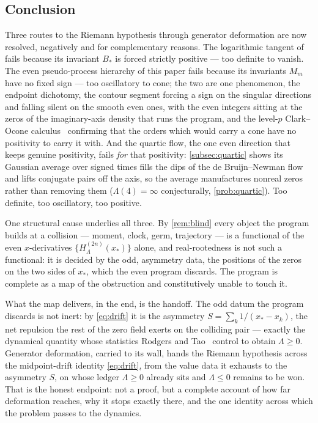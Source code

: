 \documentclass[11pt,reqno]{amsart}
\theoremstyle{plain}
\theoremstyle{definition}
\theoremstyle{remark}
\begin{document}
\subsection*{Conclusion}
Three routes to the Riemann hypothesis through generator deformation are now
resolved, negatively and for complementary reasons. The logarithmic tangent
of~\cite{Fsymbol} fails because its invariant $B_*$ is forced strictly
positive --- too definite to vanish. The even pseudo-process hierarchy of
this paper fails because its invariants $M_m$ have no fixed sign --- too
oscillatory to cone; the two are one phenomenon, the endpoint dichotomy, the
contour segment forcing a sign on the singular directions and falling silent
on the smooth even ones, with the even integers sitting at the zeros of the
imaginary-axis density that runs the program, and the level-$p$ Clark--Ocone
calculus~\cite{Fpseudo} confirming that the orders which would carry a cone
have no positivity to carry it with. And the quartic flow, the one even
direction that keeps genuine positivity, fails \emph{for} that positivity:
\cref{subsec:quartic} shows its Gaussian average over signed times fills the
dips of the de Bruijn--Newman flow and lifts conjugate pairs off the axis, so
the average manufactures nonreal zeros rather than removing them
($\Lambda(4)=\infty$ conjecturally, \cref{prob:quartic}). Too definite, too
oscillatory, too positive.

One structural cause underlies all three. By \cref{rem:blind} every object the
program builds at a collision --- moment, clock, germ, trajectory --- is a
functional of the even $x$-derivatives $\{H_\Lambda^{(2n)}(x_*)\}$ alone, and
real-rootedness is not such a functional: it is decided by the odd, asymmetry
data, the positions of the zeros on the two sides of $x_*$, which the even
program discards. The program is complete as a map of the obstruction and
constitutively unable to touch it.

What the map delivers, in the end, is the handoff. The odd datum the program
discards is not inert: by \eqref{eq:drift} it is the asymmetry
$S=\sum_k1/(x_*-x_k)$, the net repulsion the rest of the zero field exerts on
the colliding pair --- exactly the dynamical quantity whose statistics
Rodgers and Tao~\cite{RodgersTao} control to obtain $\Lambda\ge0$. Generator
deformation, carried to its wall, hands the Riemann hypothesis across the
midpoint-drift identity \eqref{eq:drift}, from the value data it exhausts to
the asymmetry $S$, on whose ledger $\Lambda\ge0$ already sits and
$\Lambda\le0$ remains to be won. That is the honest endpoint: not a proof, but
a complete account of how far deformation reaches, why it stops exactly there,
and the one identity across which the problem passes to the dynamics.
\end{document}
